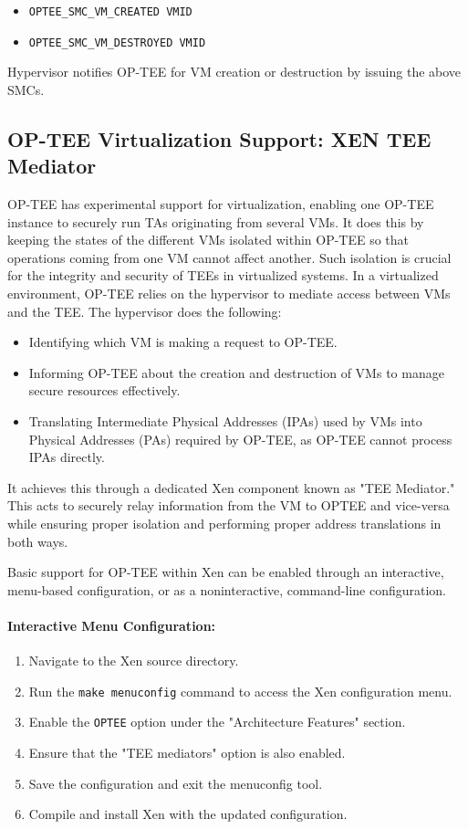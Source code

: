\documentclass[acmtog]{acmart}
\begin{document}
\begin{itemize}
  \item \texttt{OPTEE\_SMC\_VM\_CREATED VMID}
  \item \texttt{OPTEE\_SMC\_VM\_DESTROYED VMID}
\end{itemize}

Hypervisor notifies OP-TEE for VM creation or destruction by issuing the above SMCs.


\subsection{OP-TEE Virtualization Support: XEN TEE Mediator}
OP-TEE has experimental support for virtualization, enabling one OP-TEE instance to securely run TAs originating from several VMs. It does this by keeping the states of the different VMs isolated within OP-TEE so that operations coming from one VM cannot affect another. Such isolation is crucial for the integrity and security of TEEs in virtualized systems.
In a virtualized environment, OP-TEE relies on the hypervisor to mediate access between VMs and the TEE. The hypervisor does the following:

\begin{itemize}
  \item Identifying which VM is making a request to OP-TEE.
  \item Informing OP-TEE about the creation and destruction of VMs to manage secure resources effectively.
  \item Translating Intermediate Physical Addresses (IPAs) used by VMs into Physical Addresses (PAs) required by OP-TEE, as OP-TEE cannot process IPAs directly.
\end{itemize}
It achieves this through a dedicated Xen component known as "TEE Mediator." This acts to securely relay information from the VM to OPTEE and vice-versa while ensuring proper isolation and performing proper address translations in both ways.

Basic support for OP-TEE within Xen can be enabled through an interactive, menu-based configuration, or as a noninteractive, command-line configuration.


\paragraph{Interactive Menu Configuration:}
\begin{enumerate}
    \item Navigate to the Xen source directory.
    \item Run the \texttt{make menuconfig} command to access the Xen configuration menu.
    \item Enable the \texttt{OPTEE} option under the "Architecture Features" section.
    \item Ensure that the "TEE mediators" option is also enabled.
    \item Save the configuration and exit the menuconfig tool.
    \item Compile and install Xen with the updated configuration.
\end{enumerate}
\end{document}
